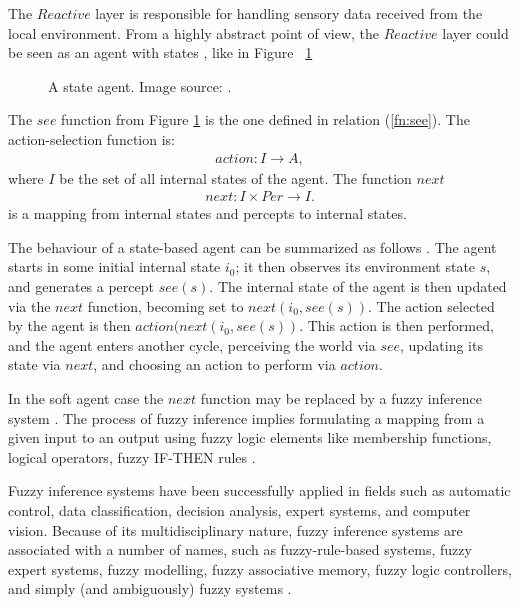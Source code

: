 The $Reactive$ layer is responsible for handling sensory data received from the local environment. From a highly abstract point of view, the $Reactive$ layer could be seen as an agent with states \cite{Wooldridge09AnIntroduction}, like in Figure ~\ref{fig:agentstate}
\begin{figure}[h!]
\centerline{}
      \caption[A state agent.]{A state agent. Image source:  \cite{Wooldridge09AnIntroduction}.}
\label{fig:agentstate}
\end{figure}


The $see$ function from Figure \ref{fig:agentstate} is the one defined in relation (\ref{fn:see}).
The action-selection function is:
\begin{align}
action : I \rightarrow A,
\end{align}
where $I$ be the set of all internal states of the agent.
The function $next$ 
\begin{align}
next: I \times Per \rightarrow I.
\end{align}
is a mapping from internal states and percepts to internal states.

The behaviour of a state-based agent can be summarized as follows \cite{Wooldridge09AnIntroduction}. The agent starts in some initial internal state $i_{0}$; it then observes its environment state $s$, and generates a percept $see(s)$. The internal state of the agent is then updated via the $next$ function, becoming set to $next(i_{0}, see(s))$. The action selected by the agent is then $action(next(i_{0}, see(s))$. This action is then performed, and the agent enters another cycle, perceiving the world via $see$, updating its state via $next$, and choosing an action to perform via $action$. 

In the soft agent case the $next$ function may be replaced by a fuzzy inference system \cite{Guillaume10Interpretable}. The process of fuzzy inference implies formulating a mapping from a given input to an output using fuzzy logic elements like membership functions, logical operators, fuzzy IF-THEN rules \cite{website:fuzzyinference}.
 
Fuzzy inference systems have been successfully applied in fields such as automatic control, data classification, decision analysis, expert systems, and computer vision. Because of its multidisciplinary nature, fuzzy inference systems are associated with a number of names, such as fuzzy-rule-based systems, fuzzy expert systems, fuzzy modelling, fuzzy associative memory, fuzzy logic controllers, and simply (and ambiguously) fuzzy systems \cite{website:fuzzyinference}.

